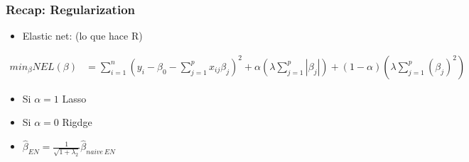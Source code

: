 \documentclass[
  shownotes,
  xcolor={svgnames},
  hyperref={colorlinks,citecolor=DarkBlue,linkcolor=DarkRed,urlcolor=DarkBlue}
  , aspectratio=169]{beamer}
\begin{document}
\begin{frame}[fragile]
\frametitle{Recap: Regularization}

\begin{itemize}
\item Elastic net: (lo que hace R)
\end{itemize}

\begin{align}
min_{\beta} NEL(\beta) &= \sum_{i=1}^n (y_i-\beta_0 - \sum_{j=1}^p x_{ij}\beta_j)^2  + \alpha\left(\lambda \sum_{j=1}^p |\beta_j|\right) + (1-\alpha)\left(\lambda \sum_{j=1}^p (\beta_j)^2\right)
\end{align}


\begin{itemize}
 \item Si $\alpha=1$ Lasso
 \item Si $\alpha=0$ Rigdge
 \item $\hat{\beta}_{EN}= \frac{1}{\sqrt{1+\lambda_2}}\hat{\beta}_{naive\,EN}$
 
\end{itemize}

\end{frame}
\end{document}
